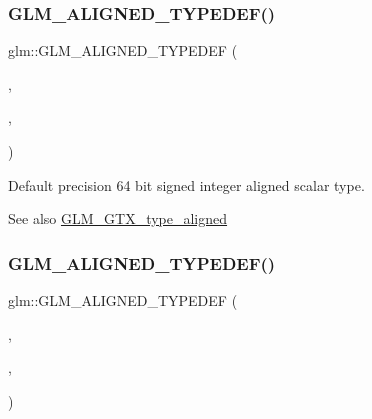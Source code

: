 \subsubsection{\texorpdfstring{G\+L\+M\+\_\+\+A\+L\+I\+G\+N\+E\+D\+\_\+\+T\+Y\+P\+E\+D\+E\+F()}{GLM\_ALIGNED\_TYPEDEF()}\hspace{0.1cm}{\footnotesize\ttfamily [40/209]}}
{\footnotesize\ttfamily glm\+::\+G\+L\+M\+\_\+\+A\+L\+I\+G\+N\+E\+D\+\_\+\+T\+Y\+P\+E\+D\+EF (\begin{DoxyParamCaption}\item[{\hyperlink{group__gtc__type__precision_ga435d75819cce297cc5fa21bd84ef89a5}{int64}}]{,  }\item[{aligned\+\_\+int64}]{,  }\item[{8}]{ }\end{DoxyParamCaption})}

Default precision 64 bit signed integer aligned scalar type. \begin{DoxySeeAlso}{See also}
\hyperlink{group__gtx__type__aligned}{G\+L\+M\+\_\+\+G\+T\+X\+\_\+type\+\_\+aligned} 
\end{DoxySeeAlso}
\mbox{\label{group__gtx__type__aligned_ga848aedf13e2d9738acf0bb482c590174}} 
\subsubsection{\texorpdfstring{G\+L\+M\+\_\+\+A\+L\+I\+G\+N\+E\+D\+\_\+\+T\+Y\+P\+E\+D\+E\+F()}{GLM\_ALIGNED\_TYPEDEF()}\hspace{0.1cm}{\footnotesize\ttfamily [41/209]}}
{\footnotesize\ttfamily glm\+::\+G\+L\+M\+\_\+\+A\+L\+I\+G\+N\+E\+D\+\_\+\+T\+Y\+P\+E\+D\+EF (\begin{DoxyParamCaption}\item[{\hyperlink{group__gtc__type__precision_ga673898d450b2a91186f3c4f40c5f8633}{int8\+\_\+t}}]{,  }\item[{aligned\+\_\+int8\+\_\+t}]{,  }\item[{1}]{ }\end{DoxyParamCaption})}

